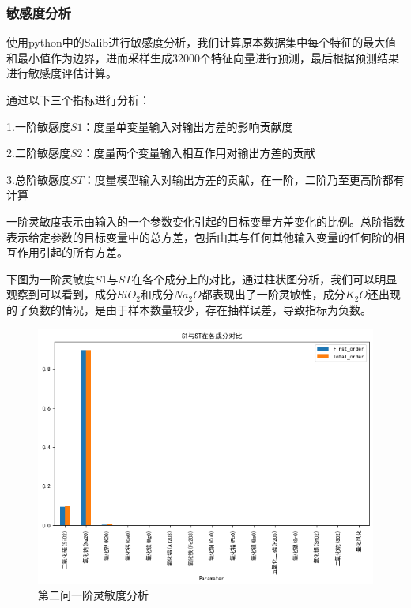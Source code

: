 \documentclass[UTF8]{ctexart}
\begin{document}
\subsubsection{敏感度分析}
使用python中的Salib进行敏感度分析，我们计算原本数据集中每个特征的最大值和最小值作为边界，进而采样生成32000个特征向量进行预测，最后根据预测结果进行敏感度评估计算。

通过以下三个指标进行分析：

    1.一阶敏感度$S1$：度量单变量输入对输出方差的影响贡献度
         
    2.二阶敏感度$S2$：度量两个变量输入相互作用对输出方差的贡献
    		
    3.总阶敏感度$ST$：度量模型输入对输出方差的贡献，在一阶，二阶乃至更高阶都有计算





一阶灵敏度表示由输入的一个参数变化引起的目标变量方差变化的比例。总阶指数表示给定参数的目标变量中的总方差，包括由其与任何其他输入变量的任何阶的相互作用引起的所有方差。

下图为一阶灵敏度$S1$与$ST$在各个成分上的对比，通过柱状图分析，我们可以明显观察到可以看到，成分$SiO_2$和成分$Na_2O$都表现出了一阶灵敏性，成分$K_2O$还出现的了负数的情况，是由于样本数量较少，存在抽样误差，导致指标为负数。
\begin{figure}[H]\centering
	\includegraphics[width=1\textwidth,height=0.7\textwidth]{img/S1.png} %
	\caption{第二问一阶灵敏度分析} %
	\label{fig:figure 6} %
\end{figure}
\end{document}

